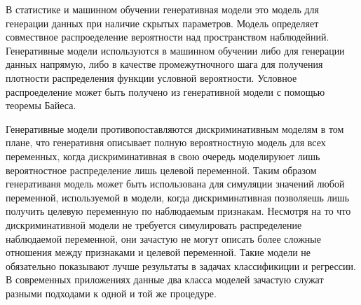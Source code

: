 \documentclass[../diploma.tex]{subfiles}
\begin{document}
В статистике и машинном обучении генеративная модели это модель для генерации данных при наличие скрытых параметров. Модель определяет совмествное распроеделение вероятности над пространством наблюдейний. Генеративные модели используются в машинном обучении либо для генерации данных напрямую, либо в качестве промежутночного шага для получения плотности распределения функции условной вероятности. Условное распроеделение может быть получено из генеративной модели с помощью теоремы Байеса.

Генеративные модели противопоставляются дискриминативным моделям в том плане, что генеративня описывает полную вероятностную модель для всех переменных, когда дискриминативная в свою очередь моделируюет лишь вероятностное распределение лишь целевой переменной. Таким образом генеративаня модель может быть использована для симуляции значений любой переменной, используемой в модели, когда дискриминативная позволяешь лишь получить целевую переменную по наблюдаемым признакам. Несмотря на то что дискриминативной модели не требуется симулировать распределение наблюдаемой переменной, они зачастую не могут описать более сложные отношения между признаками и целевой переменной. Такие модели не обязательно показывают лучше результаты в задачах классификиции и регрессии. В современных приложениях данные два класса моделей зачастую служат разными подходами к одной и той же процедуре.
\cite{wiki:generative}
\end{document}
